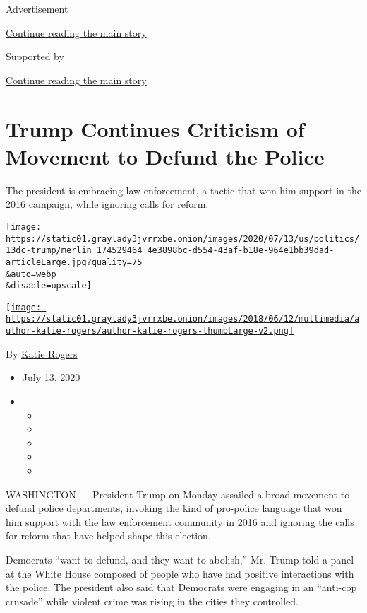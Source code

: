 Advertisement

\protect\hyperlink{after-top}{Continue reading the main story}

Supported by

\protect\hyperlink{after-sponsor}{Continue reading the main story}

\hypertarget{trump-continues-criticism-of-movement-to-defund-the-police}{%
\section{Trump Continues Criticism of Movement to Defund the
Police}\label{trump-continues-criticism-of-movement-to-defund-the-police}}

The president is embracing law enforcement, a tactic that won him
support in the 2016 campaign, while ignoring calls for reform.

\texttt{[image: https://static01.graylady3jvrrxbe.onion/images/2020/07/13/us/politics/13dc-trump/merlin\_174529464\_4e3898bc-d554-43af-b18e-964e1bb39dad-articleLarge.jpg?quality=75\\\&auto=webp\\\&disable=upscale]}

\href{https://www.nytimes3xbfgragh.onion/by/katie-rogers}{\texttt{[image: https://static01.graylady3jvrrxbe.onion/images/2018/06/12/multimedia/author-katie-rogers/author-katie-rogers-thumbLarge-v2.png]}}

By \href{https://www.nytimes3xbfgragh.onion/by/katie-rogers}{Katie
Rogers}

\begin{itemize}
\item
  July 13, 2020
\item
  \begin{itemize}
  \item
  \item
  \item
  \item
  \item
  \end{itemize}
\end{itemize}

WASHINGTON --- President Trump on Monday assailed a broad movement to
defund police departments, invoking the kind of pro-police language that
won him support with the law enforcement community in 2016 and ignoring
the calls for reform that have helped shape this election.

Democrats ``want to defund, and they want to abolish,'' Mr. Trump told a
panel at the White House composed of people who have had positive
interactions with the police. The president also said that Democrats
were engaging in an ``anti-cop crusade'' while violent crime was rising
in the cities they controlled.

